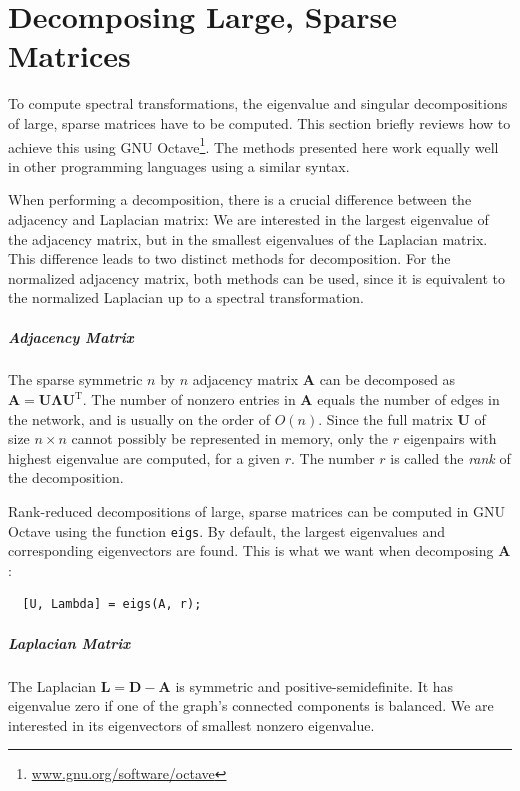 \documentclass[11pt,a4paper]{book}
\newcommand{\syRank}{r}
\newenvironment{mylisting}{\begin{list}{}{\setlength{\leftmargin}{1em}}\item\small\bfseries}{\end{list}}
\begin{document}
\chapter{Decomposing Large, Sparse Matrices}
\label{chap:decomposing}
To compute spectral transformations, the eigenvalue and singular
decompositions of large, sparse matrices have to be computed.  This
section briefly reviews how to achieve this using GNU
Octave\footnote{\href{http://www.gnu.org/software/octave/}{www.gnu.org/software/octave}}.  The methods
presented here work equally well in other programming languages using a
similar syntax. 

When performing a decomposition, there is a crucial difference between the
adjacency and Laplacian matrix:  We are interested in the largest
eigenvalue of the adjacency matrix, but in the smallest eigenvalues of
the Laplacian matrix.  This difference leads to two distinct methods for
decomposition.
For the normalized adjacency matrix, both methods can be used, since it
is equivalent to the normalized Laplacian up to a spectral
transformation. 

\paragraph{Adjacency Matrix}
The sparse symmetric $n$ by $n$ adjacency matrix $\mathbf A$ can be decomposed as
$\mathbf A = \mathbf U \mathbf \Lambda \mathbf U^{\mathrm T}$.  The number of
nonzero entries in $\mathbf A$ equals the number of edges in the
network, and is usually on the order of $O(n)$.  Since the full
matrix $\mathbf U$ of size $n\times n$ cannot possibly be represented in
memory, only the $\syRank$ eigenpairs with highest eigenvalue are
computed, for a given $\syRank$.  The number $\syRank$ is called the \emph{rank} of
the decomposition.  

Rank-reduced decompositions of large, sparse matrices can be computed in
GNU Octave using the function \texttt{eigs}.  By default, the largest
eigenvalues and corresponding eigenvectors are found.  This is what we
want when decomposing $\mathbf A$:

\begin{mylisting}
\begin{verbatim}
  [U, Lambda] = eigs(A, r); 
\end{verbatim}
\end{mylisting}

\paragraph{Laplacian Matrix}
The Laplacian $\mathbf L = \mathbf D - \mathbf A$ is symmetric and
positive-semidefinite.  It has eigenvalue zero if one of the graph's
connected components is balanced. We are interested in its eigenvectors
of smallest nonzero eigenvalue.  
\end{document}
